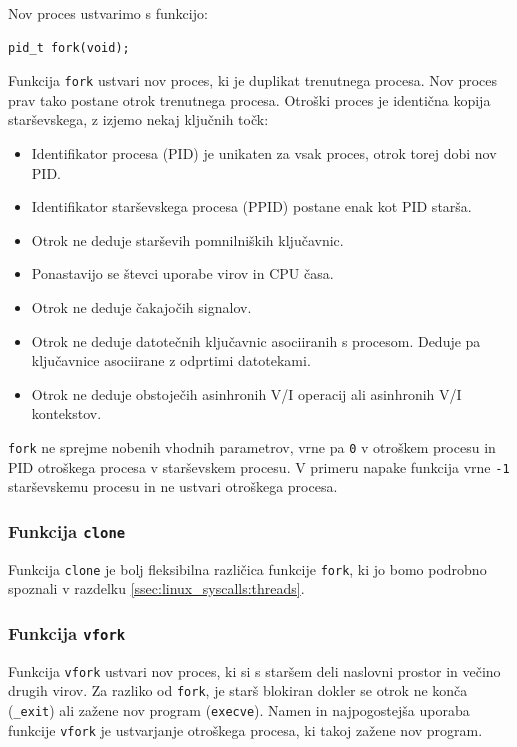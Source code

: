 \documentclass[a4paper,12pt,openright]{book}
\begin{document}
Nov proces ustvarimo s funkcijo:
\begin{lstlisting}[style=func]
 pid_t fork(void);
\end{lstlisting}

Funkcija \texttt{fork} ustvari nov proces, ki je duplikat trenutnega procesa.
Nov proces prav tako postane otrok trenutnega procesa.
Otroški proces je identična kopija starševskega, z izjemo nekaj ključnih točk:
\begin{itemize}
	\item Identifikator procesa (PID) je unikaten za vsak proces, otrok torej dobi nov PID.
	\item Identifikator starševskega procesa (PPID) postane enak kot PID starša.
	\item Otrok ne deduje starševih pomnilniških ključavnic.
	\item Ponastavijo se števci uporabe virov in CPU časa.
	\item Otrok ne deduje čakajočih signalov.
	\item Otrok ne deduje datotečnih ključavnic asociiranih s procesom. Deduje pa ključavnice asociirane z odprtimi datotekami.
	\item Otrok ne deduje obstoječih asinhronih V/I operacij ali asinhronih V/I kontekstov.
\end{itemize}

\texttt{fork} ne sprejme nobenih vhodnih parametrov, vrne pa \texttt{0} v otroškem procesu in PID otroškega procesa v starševskem procesu.
V primeru napake funkcija vrne \texttt{-1} starševskemu procesu in ne ustvari otroškega procesa.

\subsubsection{Funkcija \texttt{clone}}

Funkcija \texttt{clone} je bolj fleksibilna različica funkcije \texttt{fork}, ki jo bomo podrobno spoznali v razdelku \ref{ssec:linux_syscalls:threads}.

\subsubsection{Funkcija \texttt{vfork}}

Funkcija \texttt{vfork} ustvari nov proces, ki si s staršem deli naslovni prostor in večino drugih virov.
Za razliko od \texttt{fork}, je starš blokiran dokler se otrok ne konča (\texttt{\_exit}) ali zažene nov program (\texttt{execve}).
Namen in najpogostejša uporaba funkcije \texttt{vfork} je ustvarjanje otroškega procesa, ki takoj zažene nov program.
\end{document}
